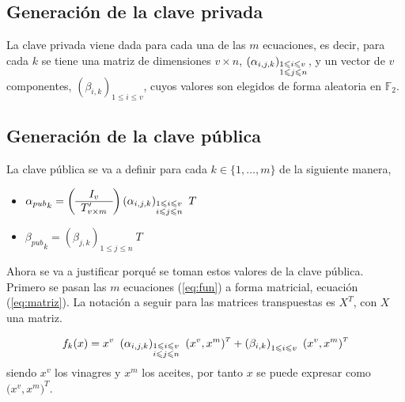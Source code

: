 \subsection{Generación de la clave privada}
La clave privada viene dada para cada una de las $m$ ecuaciones, es decir, para cada $k$ se tiene una matriz de dimensiones $v \times n$, $\left(\alpha_{i,j,k}\right)_{\begin{subarray}{l}{1\leqslant i \leqslant v }\\ {1 \leqslant j \leqslant n}\end{subarray}}$, y un vector de $v$ componentes, $\left(\beta_{i,k}\right)_{1\leqslant i \leqslant v }$, cuyos valores son elegidos de forma aleatoria en $\mathds{F}_2$.


\subsection{Generación de la clave pública}
La clave pública se va a definir para cada $k\in \{1, \dots, m\}$ de la siguiente manera, 

\begin{itemize}
	\item ${\alpha_{pub}}_k = \left(
	\begin{array}{c}
	I_v \\
	\hline
	T'_{v \times m}
	\end{array}
	\right) \left(\alpha_{i,j,k}\right)_{\begin{subarray}{l}{1 \leqslant i\leqslant v }\\ {i\leqslant j \leqslant n}\end{subarray}} \ T$
	
	\item ${\beta_{pub}}_k = \left(\beta_{j,k}\right)_{1\leqslant j\leqslant n}\ T$
\end{itemize}

Ahora se va a justificar porqué se toman estos valores de la clave pública. Primero se pasan las $m$ ecuaciones (\ref{eq:fun}) a forma matricial, ecuación (\ref{eq:matriz}). La notación a seguir para las matrices transpuestas es $X^{\scriptscriptstyle T}$, con $X$ una matriz.

\begin{equation}\label{eq:matriz} 
	f_k(x) = x^v\ \left(\alpha_{i,j,k}\right)_{\begin{subarray}{l}{1\leqslant i \leqslant v }\\ {i \leqslant j \leqslant n}\end{subarray}}\ \left(x^v, x^m \right)^{\scriptscriptstyle T} + \left(\beta_{i,k}\right)_{1\leqslant i \leqslant v }\ \left(x^v, x^m\right)^{\scriptscriptstyle T}
\end{equation}
siendo $x^v$ los vinagres y $x^m$ los aceites, por tanto $x$ se puede expresar como $\big(x^v, x^m\big)^{\scriptscriptstyle T}$.\\


